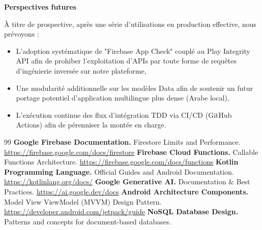\documentclass[12pt,a4paper]{report}
\begin{document}
\textbf{Perspectives futures}

À titre de prospective, après une série d'utilisations en production effective, nous prévoyons :
\begin{itemize}
    \item L'adoption systématique de "Firebase App Check" couplé au Play Integrity API afin de prohiber l'exploitation d'APIs par toute forme de requêtes d'ingénierie inversée sur notre plateforme,
    \item Une modularité additionnelle sur les modèles Data afin de soutenir un futur portage potentiel d’application multilingue plus dense (Arabe local),
    \item L’exécution continue des flux d’intégration TDD via CI/CD (GitHub Actions) afin de pérenniser la montée en charge.
\end{itemize}

\begin{thebibliography}{99}
     \textbf{Google Firebase Documentation.} Firestore Limits and Performance. \url{https://firebase.google.com/docs/firestore}
     \textbf{Firebase Cloud Functions.} Callable Functions Architecture. \url{https://firebase.google.com/docs/functions}
     \textbf{Kotlin Programming Language.} Official Guides and Android Documentation. \url{https://kotlinlang.org/docs/}
     \textbf{Google Generative AI.} Documentation \& Best Practices. \url{https://ai.google.dev/docs}
     \textbf{Android Architecture Components.} Model View ViewModel (MVVM) Design Pattern. \url{https://developer.android.com/jetpack/guide}
     \textbf{NoSQL Database Design.} Patterns and concepts for document-based databases.
\end{thebibliography}
\end{document}
